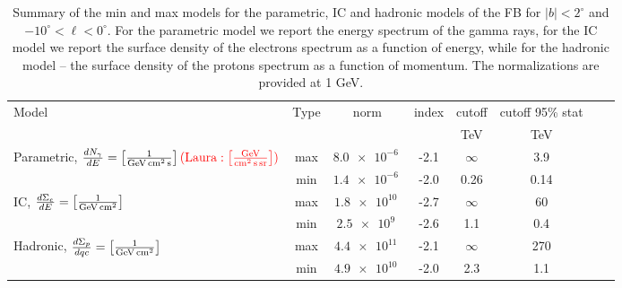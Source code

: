 \begin{table}
  \begin{center}
    \caption{Summary of the min and max models for the parametric, 
    IC and hadronic models of the FB for $|b| < 2^\circ$ and $-10^\circ < \ell < 0^\circ$. 
    For the parametric model we report the energy spectrum of the gamma rays,
    for the IC model we report the surface density of the electrons spectrum as a function of energy,
    while for the hadronic model -- the surface density of the protons spectrum as a function of momentum.
    The normalizations are provided at 1 GeV.}
    \label{tab:summary}
    \begin{tabular}{| l |c|c|c|c|c|c|c|} %
     	\hline
		 {\hspace{2cm}Model} & Type  & norm & index & cutoff & cutoff 95\% stat \\ 
		       &        &   &  & {\rm TeV} & {\rm TeV}\\ 
		\hline
  		\multirow{2}{*}{Parametric, $\frac{dN_\gamma}{dE} = \left[{\rm \frac{1}{GeV\, cm^{2}\, s}}\right]\rm \textcolor{red}{(Laura:  \left[\rm \frac{GeV}{cm^2\, s\, sr}\right])}$} & max & $\SI{8.0e-6}{}$  & -2.1 &  $\infty$ & 3.9 \\ 
		& min & $\SI{1.4e-6}{}$ & -2.0 &  0.26 & 0.14  \\ 
 		\hline
  		\multirow{2}{*}{IC, $\frac{d\Sigma_e}{dE} = \left[{\rm \frac{1}{GeV\, cm^2}}\right]$}& max & $\SI{1.8e10}{}$  & -2.7 &  $\infty$ & 60 \\ 
		& min & $\SI{2.5e9}{}$  & -2.6 &  1.1 & 0.4  \\ 
 		\hline
  		\multirow{2}{*}{Hadronic, $\frac{d\Sigma_p}{dqc} = \left[{\rm \frac{1}{GeV\, cm^2}}\right]$} & max & $\SI{4.4e11}{}$  & -2.1 &  $\infty$ & 270 \\ 
		& min & $\SI{4.9e10}{}$  & -2.0 &  2.3 & 1.1  \\ 
 \hline
    \end{tabular}
  \end{center}
\end{table}

